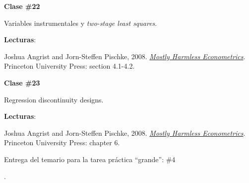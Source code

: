 \documentclass[letterpaper]{article}
\renewenvironment{itemize}{
  \begin{list}{}{
    \setlength{\leftmargin}{1.5em}
  }
}{
  \end{list}
}
\begin{document}
\begin{enumerate}
      \begin{itemize} 
        \item[$\bullet$] {\bf Clase \#22}
          \begin{itemize} 
            \item[$\circ$] Variables instrumentales y \emph{two-stage least squares}.
            \item[$\circ$] {\bf Lecturas}: 
              \begin{itemize}
                \item[$\diamond$] Joshua Angrist and Jorn-Steffen Pischke, 2008. \href{https://github.com/hbahamonde/Metodos_Cuanti_I/raw/master/Readings/MHE.pdf}{\emph{Mostly Harmless Econometrics}}. Princeton University Press: section 4.1-4.2.
              \end{itemize}
          \end{itemize}
      \end{itemize}







      \begin{itemize} 
        \item[$\bullet$] {\bf Clase \#23}
          \begin{itemize} 
            \item[$\circ$] Regression discontinuity designs.
            \item[$\circ$] {\bf Lecturas}: 
              \begin{itemize}
                \item[$\diamond$] Joshua Angrist and Jorn-Steffen Pischke, 2008. \href{https://github.com/hbahamonde/Metodos_Cuanti_I/raw/master/Readings/MHE.pdf}{\emph{Mostly Harmless Econometrics}}. Princeton University Press: chapter 6.
                {\color{orange}\item[$\bigstar$] Entrega del temario para la tarea pr\'actica ``grande'': \#4}.
              \end{itemize}
          \end{itemize}
      \end{itemize}



\end{enumerate}
\end{document}
